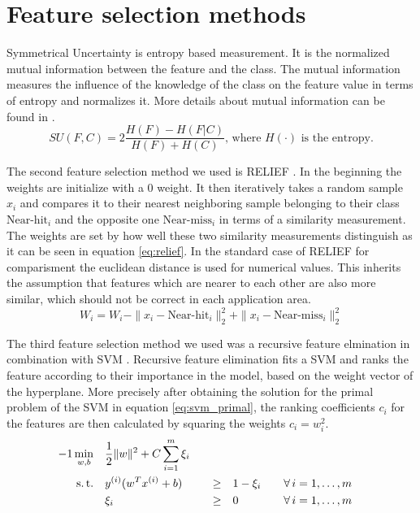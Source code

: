 \documentclass[twoside,11pt]{article}
\begin{document}
\section{Feature selection methods}

Symmetrical Uncertainty \citep{press1996numerical} is entropy based measurement. It is the normalized mutual information between the feature
and the class. The mutual information measures the influence of the knowledge of the class on the feature value
in terms of entropy and normalizes it. More details about mutual information can be found in \cite{paninski2003estimation}.
\begin{equation}
  \label{eq:su}
  SU(F,C) = 2 \frac{H(F) - H(F|C)}{H(F) + H(C)} \textrm{, where } H(\cdot) \textrm{ is the entropy.}
\end{equation}

The second feature selection method we used is RELIEF \citep{kira1992feature}. In the beginning the weights are initialize
with a $0$ weight.
It then iteratively takes a random sample $x_i$ and compares it to their nearest neighboring sample belonging to their class
$\textrm{Near-hit}_i$ and the opposite one $\textrm{Near-miss}_i$ in terms of a similarity measurement.
The weights are set by how well these two similarity measurements distinguish as it can be seen in equation \ref{eq:relief}.
In the standard case of RELIEF for comparisment the euclidean distance is used for numerical values. This inherits the
assumption that features which are nearer to each other are also more similar, which should not be correct in each application
area.
\begin{equation}
  \label{eq:relief}
  W_i = W_i - \|x_i - \textrm{Near-hit}_i\|_2^2 + \|x_i - \textrm{Near-miss}_i\|_2^2
\end{equation}

The third feature selection method we used was a recursive feature elmination in combination with SVM \citep{guyon2002gene}.
Recursive feature elimination fits a SVM and ranks the feature according to their importance in the model,
based on the weight vector of the hyperplane.
More precisely after obtaining the solution for the primal problem of the SVM in equation \ref{eq:svm_primal},
the ranking coefficients $c_i$ for the features are then calculated by squaring the weights $c_i = w_i^2$.
\begin{alignat}{-1}
     \min_{w,b}  & \quad \frac12\|w\|^2 + C\sum_{i=1}^m \xi_i & & & \label{eq:svm_primal} \\ 
   \text{s.\,t.} & \quad y^{(i)} (w^Tx^{(i)} + b) & \quad \geq & \quad 1 -\xi_i &&
                   \quad \forall \, i = 1, \ldots, m \nonumber \\
                 & \quad \xi_i                  & \quad \geq & \quad 0 &&
                   \quad \forall \, i = 1, \ldots, m \nonumber 
\end{alignat}
\end{document}
